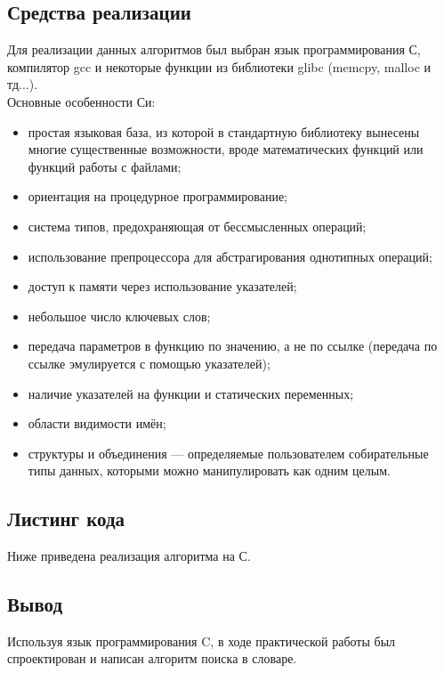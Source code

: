 \documentclass[a4paper,12pt]{article}
\begin{document}
\newpage
\subsection{Средства реализации}
Для реализации данных алгоритмов был выбран язык программирования С, компилятор gcc и некоторые функции из библиотеки glibc (memcpy, malloc и тд...). \\
Основные особенности Си: \\
\begin{itemize}
\item простая языковая база, из которой в стандартную библиотеку вынесены многие существенные возможности, вроде математических функций или функций работы с файлами;
\item ориентация на процедурное программирование;
\item система типов, предохраняющая от бессмысленных операций;
\item использование препроцессора для абстрагирования однотипных операций;
\item доступ к памяти через использование указателей;
\item небольшое число ключевых слов;
\item передача параметров в функцию по значению, а не по ссылке (передача по ссылке эмулируется с помощью указателей);
\item наличие указателей на функции и статических переменных;
\item области видимости имён;
\item структуры и объединения — определяемые пользователем собирательные типы данных, которыми можно манипулировать как одним целым.
\end{itemize}


\newpage
\subsection{Листинг кода}
Ниже приведена реализация алгоритма на С.\\


\newpage
\subsection{Вывод}
Используя язык программирования C, в ходе практической работы был спроектирован и написан алгоритм поиска в словаре.
\end{document}
